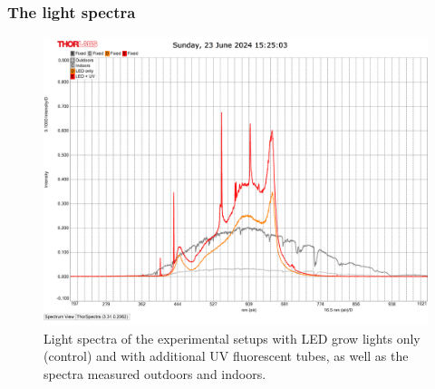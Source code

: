 \documentclass[
    12pt,
    aspectratio=1610,
    bibliography=../bibliography.bib,
    link-citations]{beamer}
\begin{document}
    \begin{frame}
        \frametitle{The light spectra}
        \begin{figure}
            \includegraphics[width=0.6\linewidth]{light-spectra_outdoors_indoors_led_led+uv}
            \caption{Light spectra of the experimental setups with LED grow lights only (control) and with additional UV fluorescent tubes, as well as the spectra measured outdoors and indoors.}
        \end{figure}
    \end{frame}
\end{document}
